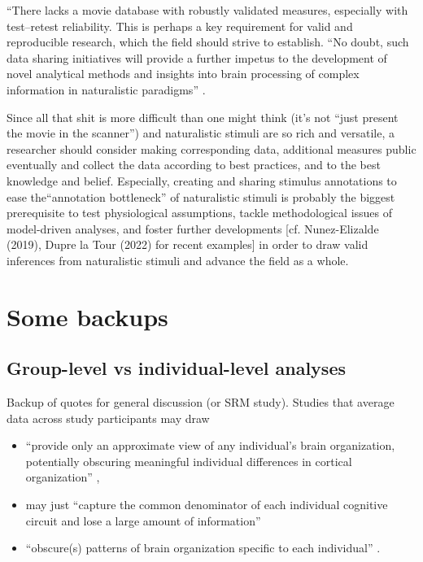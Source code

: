%
``There lacks a movie database with robustly validated measures, especially with
test--retest reliability.
%
This is perhaps a key requirement for valid and reproducible research, which the
field should strive to establish.
%
``No doubt, such data sharing initiatives will provide a further impetus to the
development of novel analytical methods and insights into brain processing of
complex information in naturalistic paradigms''
\citep{sonkusare2019naturalistic}.

%
Since all that shit is more difficult than one might think (it's not ``just
present the movie in the scanner'') and naturalistic stimuli are so rich and
versatile, a researcher should consider making corresponding data, additional
measures public eventually and collect the data according to best practices, and
to the best knowledge and belief.
%
Especially, creating and sharing stimulus annotations to ease the``annotation
bottleneck'' \citep[][p. 16]{aliko2020naturalistic} of naturalistic stimuli is
probably the biggest prerequisite to test physiological assumptions, tackle
methodological issues of model-driven analyses, and foster further developments
[cf.  Nunez-Elizalde (2019), Dupre la Tour (2022) for recent examples] in order
to draw valid inferences from naturalistic stimuli and advance the field as a
whole.


\pagebreak


\section{Some backups}


\subsection{Group-level vs individual-level analyses}

Backup of quotes for general discussion (or SRM study).  Studies that average
data across study participants may draw

\begin{itemize}

\item ``provide only an approximate view of any individual's brain organization,
    potentially obscuring meaningful individual differences in cortical
        organization'' \citep{laumann2015functional},

\item may just ``capture the common denominator of each individual cognitive
    circuit and lose a large amount of information''

\item ``obscure(s) patterns of brain organization specific to each individual''
    \citep{laumann2015functional}.

\end{itemize}


